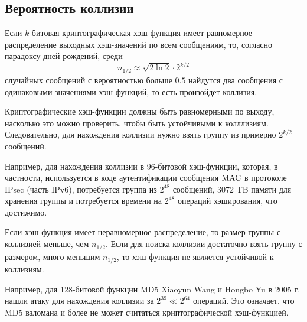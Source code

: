 \subsection{Вероятность коллизии}

Если $k$-битовая криптографическая хэш-функция имеет равномерное распределение выходных хэш-значений по всем сообщениям, то, согласно парадоксу дней рождений, среди
    \[ n_{1/2} \approx \sqrt{2 \ln 2} \cdot 2^{k/2} \]
случайных сообщений с вероятностью больше $0.5$ найдутся два сообщения с одинаковыми значениями хэш-функций, то есть произойдет коллизия.

Криптографические хэш-функции должны быть равномерными по выходу, насколько это можно проверить, чтобы быть устойчивыми к колллизиям. Следовательно, для нахождения коллизии нужно взять группу из примерно $2^{k/2}$ сообщений.

Например, для нахождения коллизии в 96-битовой хэш-функции, которая, в частности, используется в коде аутентификации сообщения $\textrm{MAC}$ в протоколе IPsec (часть IPv6), потребуется группа из $2^{48}$ сообщений, 3072 TB памяти для хранения группы и потребуется времени на $2^{48}$ операций хэширования, что достижимо.

Если хэш-функция имеет неравномерное распределение, то размер группы с коллизией меньше, чем $n_{1/2}$. Если для поиска коллизии достаточно взять группу с размером, много меньшим $n_{1/2}$, то хэш-функция не является устойчивой к коллизиям.

Например, для 128-битовой функции MD5 Xiaoyun Wang и Hongbo Yu в 2005 г. нашли атаку для нахождения коллизии за $2^{39} \ll 2^{64}$ операций. Это означает, что MD5 взломана и более не может считаться криптографической хэш-функцией.
